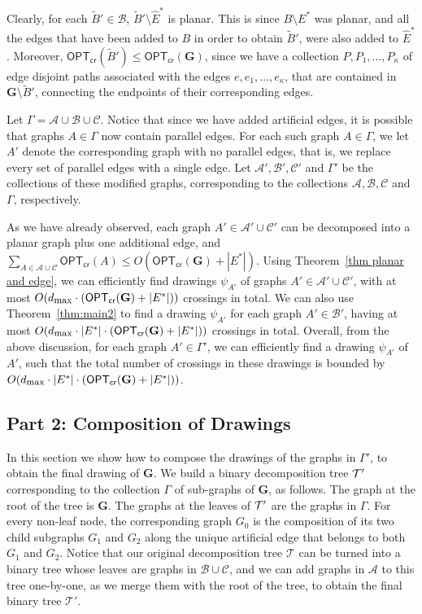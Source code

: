 \documentclass[twoside,leqno,twocolumn]{article}
\newcommand{\tset}{{\mathcal T}}
\newcommand{\bset}{{\mathcal{B}}}
\newcommand{\aset}{{\mathcal{A}}}
\newcommand{\cset}{{\mathcal{C}}}
\newcommand{\optcro}[1]{\mathsf{OPT}_{\mathsf{cr}}(#1)}
\newcommand{\dmax}{d_{\mbox{\textup{\footnotesize{max}}}}}
\newcommand{\G}{{\mathbf{G}}}
\begin{document}
Clearly, for each $\tilde{B}'\in \bset$, $\tilde{B}'\setminus\hat{E}^*$ is planar. This is since $B\setminus E^*$ was planar, and all the edges that have been added to $B$ in order to obtain $\tilde{B}'$, were also added to $\hat{E}^*$. Moreover, $\optcro{\tilde{B}'}\leq \optcro{\G}$, since we have a collection $P,P_1,\ldots,P_{\kappa}$ of edge disjoint paths associated with the edges $e,e_1,\ldots,e_{\kappa}$, that are contained in $\G\setminus \tilde{B}'$, connecting the endpoints of their corresponding edges.

Let $\Gamma=\aset\cup \bset\cup\cset$. Notice that since we have added artificial edges, it is possible that graphs $A\in \Gamma$ now contain parallel edges. For each such graph $A\in \Gamma$, we let $A'$ denote the corresponding graph with no parallel edges, that is, we replace every set of parallel edges with a single edge. Let $\aset',\bset',\cset'$ and $\Gamma'$ be the collections of these modified graphs, corresponding to the collections $\aset,\bset,\cset$ and $\Gamma$, respectively.

As we have already observed, each graph $A'\in \aset'\cup \cset'$ can be decomposed into a planar graph plus one additional edge, and
 $\sum_{A\in \aset\cup \cset} \optcro{A}\leq O(\optcro{\G}+|E^*|)$. Using Theorem~\ref{thm planar and edge}, we can efficiently find drawings $\psi_{A'}$ of graphs $A'\in \aset'\cup \cset'$, with at most $O(\dmax\cdot(\optcro{\G}+|E^*|))$ crossings in total.
 We can also use Theorem~\ref{thm:main2} to find a drawing $\psi_{A'}$ for each graph $A'\in \bset'$, having at most $O(\dmax\cdot |E^*|\cdot(\optcro{\G}+|E^*|))$ crossings in total. Overall, from the above discussion, for each graph $A'\in \Gamma'$, we can efficiently find a drawing $\psi_{A'}$ of $A'$, such that the total number of crossings in these drawings is bounded by $O(\dmax\cdot |E^*|\cdot(\optcro{\G}+|E^*|))$.

\subsection{Part 2: Composition of Drawings}
In this section we show how to compose the drawings of the graphs in $\Gamma'$, to obtain the final drawing of $\G$.
We build a binary decomposition tree $\cal T'$ corresponding to the
collection $\Gamma$ of sub-graphs of $\G$, as follows.
The graph at the root of the tree is $\G$. The graphs at the leaves of $\cal T'$
are the graphs in $\Gamma$. For every non-leaf node, the corresponding graph $G_0$
is the composition of its two child subgraphs $G_1$
and $G_2$ along the unique artificial edge that belongs to both $G_1$ and $G_2$.
Notice that our original decomposition tree $\tset$ can be turned into a binary tree whose leaves are graphs in $\bset\cup \cset$, and we can add graphs in $\aset$ to this tree one-by-one, as we merge them with the root of the tree, to obtain the final binary tree $\tset'$.
\end{document}
